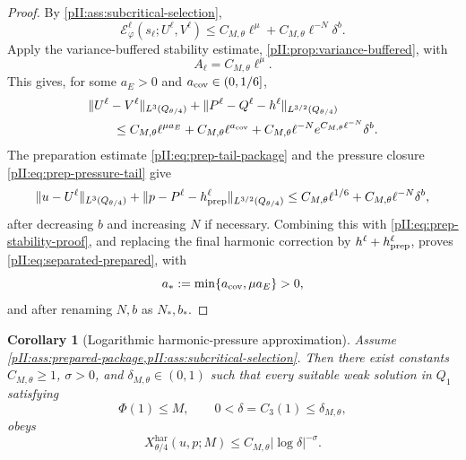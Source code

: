 \documentclass[11pt]{article}
\numberwithin{equation}{section}
\theoremstyle{plain}
\newtheorem{corollary}{Corollary}[section]
\theoremstyle{definition}
\theoremstyle{remark}
\newcommand{\har}{\mathrm{har}}
\begin{document}
\begin{proof}
By \cref{pII:ass:subcritical-selection},
\[
        \mathcal E_\varphi^\ell(s_\ell;U^\ell,V^\ell)
        \le C_{M,\theta}\ell^\mu+C_{M,\theta}\ell^{-N}\delta^b.
\]
Apply the variance-buffered stability estimate, \cref{pII:prop:variance-buffered}, with
\[
        A_\ell=C_{M,\theta}\ell^\mu.
\]
This gives, for some $a_E>0$ and $a_{\rm cov}\in(0,1/6]$,
\begin{equation}\label{pII:eq:prep-stability-proof}
\begin{aligned}
        &\|U^\ell-V^\ell\|_{L^3(Q_{\theta/4})}
        +\|P^\ell-Q^\ell-h^\ell\|_{L^{3/2}(Q_{\theta/4})} \\
        &\qquad\le C_{M,\theta}\ell^{\mu a_E}
        +C_{M,\theta}\ell^{a_{\rm cov}}
        +C_{M,\theta}\ell^{-N}e^{C_{M,\theta}\ell^{-N}}\delta^b.
\end{aligned}
\end{equation}
The preparation estimate \eqref{pII:eq:prep-tail-package} and the pressure closure \eqref{pII:eq:prep-pressure-tail} give
\[
        \|u-U^\ell\|_{L^3(Q_{\theta/4})}
        +\|p-P^\ell-h_{\rm prep}^\ell\|_{L^{3/2}(Q_{\theta/4})}
        \le C_{M,\theta}\ell^{1/6}+C_{M,\theta}\ell^{-N}\delta^b,
\]
after decreasing $b$ and increasing $N$ if necessary.  Combining this with \eqref{pII:eq:prep-stability-proof}, and replacing the final harmonic correction by \(h^\ell+h_{\rm prep}^\ell\), proves \eqref{pII:eq:separated-prepared}, with
\[
        a_*:=\min\{a_{\rm cov},\mu a_E\}>0,
\]
and after renaming $N,b$ as $N_*,b_*$.
\end{proof}

\begin{corollary}[Logarithmic harmonic-pressure approximation]\label{pII:cor:log-approximation}
Assume \cref{pII:ass:prepared-package,pII:ass:subcritical-selection}.  Then there exist constants $C_{M,\theta}\ge1$, $\sigma>0$, and $\delta_{M,\theta}\in(0,1)$ such that every suitable weak solution in $Q_1$ satisfying
\[
        \Phi(1)\le M,
        \qquad
        0<\delta=C_3(1)\le\delta_{M,\theta},
\]
obeys
\begin{equation}\label{pII:eq:log-X}
        X_{\theta/4}^{\har}(u,p;M)
        \le C_{M,\theta}|\log\delta|^{-\sigma}.
\end{equation}
\end{corollary}
\end{document}
